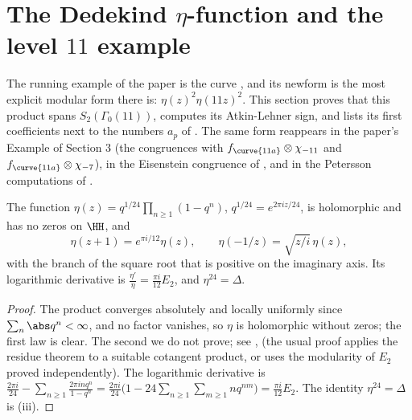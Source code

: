\section{The Dedekind \texorpdfstring{$\eta$}{eta}-function and the level \texorpdfstring{$11$}{11} example}\label{sec:modforms:eta}

The running example of the paper is the curve , and its newform is the most explicit modular form there is: $\eta(z)^2\eta(11z)^2$. This section proves
that this product spans $S_2(\Gamma_0(11))$, computes its Atkin-Lehner sign, and lists its first coefficients next to the numbers $a_p$ of . The same
form reappears in the paper's Example of Section 3 (the congruences with $f_{\curve{11a}}\otimes\chi_{-11}$ and $f_{\curve{11a}}\otimes\chi_{-7}$), in the
Eisenstein congruence of , and in the Petersson computations of .

\begin{proposition}\label{prop:modforms:eta}
The function $\eta(z)=q^{1/24}\prod_{n\ge1}(1-q^n)$, $q^{1/24}=e^{2\pi iz/24}$, is holomorphic and has no zeros on $\HH$, and
\[
\eta(z+1)=e^{\pi i/12}\eta(z),\qquad\eta(-1/z)=\sqrt{z/i}\,\eta(z),
\]
with the branch of the square root that is positive on the imaginary axis. Its logarithmic derivative is $\frac{\eta'}\eta=\frac{\pi i}{12}E_2$, and $\eta^{24}=\Delta$.
\end{proposition}

\begin{proof}
The product converges absolutely and locally uniformly since $\sum_n\abs q^n<\infty$, and no factor vanishes, so $\eta$ is holomorphic without zeros; the first law is
clear. The second we do not prove; see \cite[Chapter 3]{Apostol90}, \cite[Section III.2]{Koblitz} (the usual proof applies the residue theorem to a suitable
cotangent product, or uses the modularity of $E_2$ proved independently). The logarithmic derivative is
$\frac{2\pi i}{24}-\sum_{n\ge1}\frac{2\pi inq^n}{1-q^n}=\frac{2\pi i}{24}\bigl(1-24\sum_{n\ge1}\sum_{m\ge1}nq^{nm}\bigr)=\frac{\pi i}{12}E_2$. The identity $\eta^{24}=\Delta$ is
(iii).
\end{proof}

